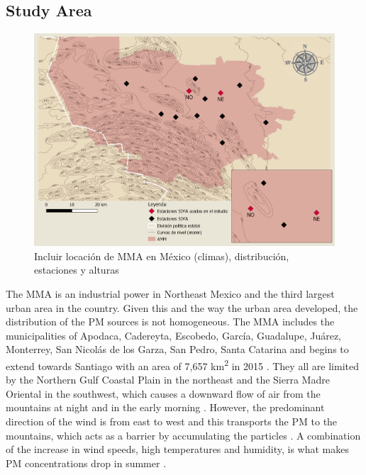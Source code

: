 \subsection{Study Area}
\begin{figure}[H]
    \centering
    \includegraphics[scale=0.15]{images/map.png}
    \caption{Incluir locación de MMA en México (climas), distribución, estaciones y alturas}
    \label{fig:map}
\end{figure}
The MMA is an industrial power in Northeast Mexico and the third largest urban area in the country.
Given this and the way the urban area developed, the distribution of the PM sources is not homogeneous.
The MMA includes the municipalities of Apodaca, Cadereyta, Escobedo, García, Guadalupe, Juárez, Monterrey,
San Nicolás de los Garza, San Pedro, Santa Catarina and begins to extend towards Santiago with an area of 7,657
km\textsuperscript{2} in 2015 \cite{inegi2015}. They all are limited by the Northern Gulf Coastal Plain
in the northeast and the Sierra Madre Oriental in the southwest, which causes a downward flow of
air from the mountains at night and in the early morning \cite{molina2019}. However, the predominant
direction of the wind is from east to west and this transports the PM to the mountains, which acts as a barrier
by accumulating the particles \cite{gonzalez2011}. A combination of the increase in wind speeds,
high temperatures and humidity, is what makes PM concentrations drop in summer
\cite{gonzalez2011,sima2019}.
